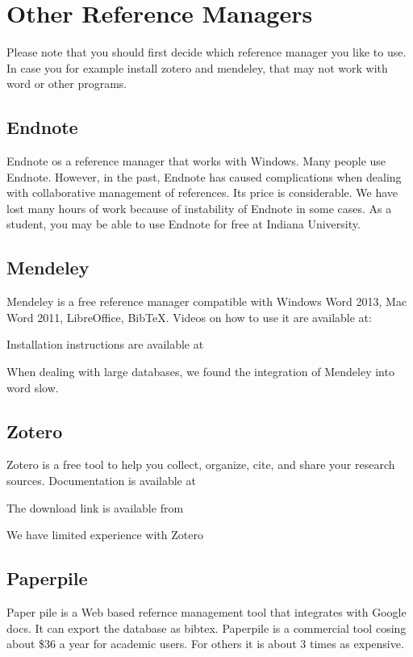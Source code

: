 \section{Other Reference Managers}\label{other-reference-managers}

Please note that you should first decide which reference manager you
like to use. In case you for example install zotero and mendeley, that
may not work with word or other programs.

\subsection{Endnote}\label{endnote}

Endnote os a reference manager that works with Windows. Many people use
Endnote. However, in the past, Endnote has caused complications when
dealing with collaborative management of references. Its price is
considerable. We have lost many hours of work because of instability of
Endnote in some cases. As a student, you may be able to use Endnote for
free at Indiana University.



\subsection{Mendeley}\label{mendeley}

Mendeley is a free reference manager compatible with Windows Word 2013,
Mac Word 2011, LibreOffice, BibTeX. Videos on how to use it are
available at:



Installation instructions are available at



When dealing with large databases, we found the integration of Mendeley
into word slow.

\subsection{Zotero}\label{zotero}

Zotero is a free tool to help you collect, organize, cite, and share
your research sources. Documentation is available at


The download link is available from



We have limited experience with Zotero

\subsection{Paperpile}

Paper pile is a Web based refernce management tool that integrates
with Google docs. It can export the database as bibtex. Paperpile is a
commercial tool cosing about \$36 a year for academic users. For
others it is about 3 times as expensive.

